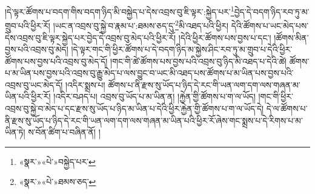 །དེ་ལྟར་ཚོགས་པ་བདག་གིས་བདག་ཉིད་མི་བསྐྱེད་པ་དེས་འབྲས་བུ་ཇི་ལྟར་:སྐྱེད་པར་\footnote{«སྣར་»«པེ་»བསྐྱེད་པར་}བྱེད་དེ་བདག་ཉིད་རབ་ཏུ་མ་གྲུབ་པའི་ཕྱིར་རོ། །ཡང་ན་འབྲས་བུ་སྐྱེ་བ་རྣམ་པ་:ཐམས་ཅད་དུ་\footnote{«སྣར་»«པེ་»ཐམས་ཅད་}མི་འཐད་པའི་ཕྱིར། དེའི་ཚོགས་པ་ཡང་མེད་པས་དེས་འབྲས་བུ་ཇི་ལྟར་སྐྱེད་པར་བྱེད་དེ་འབྲས་བུ་མེད་པའི་ཕྱིར་རོ། །དེའི་ཕྱིར་ཚོགས་པས་བྱས་པ་དང་། །ཚོགས་མིན་བྱས་པའི་འབྲས་བུ་མེད། །དེ་ལྟར་གང་གི་ཕྱིར་ཚོགས་པ་དེ་བདག་ཉིད་མ་སྐྱེས་ཤིང་རབ་ཏུ་མ་གྲུབ་པ་དེའི་ཕྱིར་ཚོགས་པས་བྱས་པའི་འབྲས་བུ་མེད་དོ། །གང་གི་ཚེ་ཚོགས་པས་བྱས་པའི་འབྲས་བུ་ཉིད་མི་འཐད་པ་དེའི་ཚེ། ཚོགས་པ་མ་ཡིན་པས་བྱས་པའི་འབྲས་བུ་རྒྱུ་མེད་པ་ལས་བྱུང་བ་ཡང་མི་འཐད་པས་ཚོགས་པ་མ་ཡིན་པས་བྱས་པའི་འབྲས་བུ་ཡང་མེད་དོ། །འདིར་སྨྲས་པ། ཚོགས་པ་ནི་རྫས་སུ་ཡོད་པ་ཉིད་དེ་རང་གི་ཡན་ལག་དག་ལས་གཞན་མ་ཡིན་པའི་ཕྱིར་རོ། །འདིར་བཤད་པ། འབྲས་བུ་ཡོད་པ་མ་ཡིན་ན། །རྐྱེན་གྱི་ཚོགས་པ་ག་ལ་ཡོད། །གང་གི་ཕྱིར་འབྲས་བུ་སྐྱེ་བ་མེད་པ་དང་རྫས་སུ་ཡོད་པ་ཉིད་མ་ཡིན་པ་དེའི་ཕྱིར་རྐྱེན་གྱི་ཚོགས་པ་ག་ལ་ཡོད་དེ། དེ་ལ་ཚོགས་པ་ནི་རྫས་སུ་ཡོད་པ་ཉིད་དེ་རང་གི་ཡན་ལག་དག་ལས་གཞན་མ་ཡིན་པའི་ཕྱིར་རོ་ཞེས་གང་སྨྲས་པ་དེ་རིགས་པ་མ་ཡིན་ཏེ། ས་བོན་ཚིག་པ་བཞིན་ནོ། །
